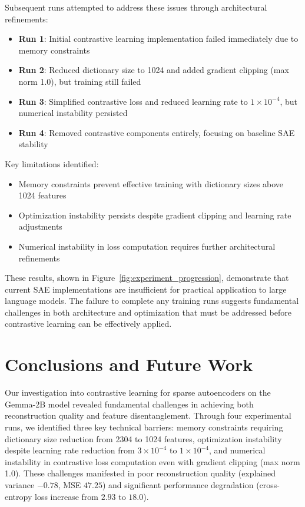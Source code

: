 \documentclass{article} %
\begin{document}
Subsequent runs attempted to address these issues through architectural refinements:

\begin{itemize}
    \item \textbf{Run 1}: Initial contrastive learning implementation failed immediately due to memory constraints
    \item \textbf{Run 2}: Reduced dictionary size to 1024 and added gradient clipping (max norm 1.0), but training still failed
    \item \textbf{Run 3}: Simplified contrastive loss and reduced learning rate to $1\times10^{-4}$, but numerical instability persisted
    \item \textbf{Run 4}: Removed contrastive components entirely, focusing on baseline SAE stability
\end{itemize}

Key limitations identified:
\begin{itemize}
    \item Memory constraints prevent effective training with dictionary sizes above 1024 features
    \item Optimization instability persists despite gradient clipping and learning rate adjustments
    \item Numerical instability in loss computation requires further architectural refinements
\end{itemize}

These results, shown in Figure~\ref{fig:experiment_progression}, demonstrate that current SAE implementations are insufficient for practical application to large language models. The failure to complete any training runs suggests fundamental challenges in both architecture and optimization that must be addressed before contrastive learning can be effectively applied.

\section{Conclusions and Future Work}
\label{sec:conclusion}

Our investigation into contrastive learning for sparse autoencoders on the Gemma-2B model revealed fundamental challenges in achieving both reconstruction quality and feature disentanglement. Through four experimental runs, we identified three key technical barriers: memory constraints requiring dictionary size reduction from 2304 to 1024 features, optimization instability despite learning rate reduction from $3\times10^{-4}$ to $1\times10^{-4}$, and numerical instability in contrastive loss computation even with gradient clipping (max norm 1.0). These challenges manifested in poor reconstruction quality (explained variance $-0.78$, MSE $47.25$) and significant performance degradation (cross-entropy loss increase from $2.93$ to $18.0$).
\end{document}
